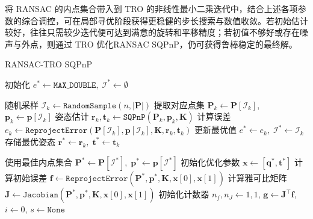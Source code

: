 将 RANSAC 的内点集合带入到 TRO 的非线性最小二乘迭代中，结合上述各项参数的综合调控，可在局部寻优阶段获得更稳健的步长搜索与数值收敛。若初始估计较好，往往只需较少迭代便可达到满意的旋转和平移精度；若初值不够好或存在噪声与外点，则通过 TRO 优化RANSAC SQPnP，仍可获得鲁棒稳定的最终解。
\begin{algorithm}[!htbp]
	\caption{RANSAC-TRO SQPnP}
	\label{alg:RANSAC_TRO_SQPnP}
	\begin{spacing}{0.9}  %
		\footnotesize        %
		\begin{algorithmic}[1]
			
			\State 初始化 $e^* \gets \texttt{MAX\_DOUBLE},\;\mathcal{I}^* \gets \emptyset$
			
			\State 随机采样 $\mathcal{I}_k \gets \texttt{RandomSample}(n, |\mathbf{P}|)$
			\State 提取对应点集 $\mathbf{P}_k \gets \mathbf{P}[\mathcal{I}_k]$, $\mathbf{p}_k \gets \mathbf{p}[\mathcal{I}_k]$
			\State 姿态估计 $\mathbf{r}_k, \mathbf{t}_k \gets \texttt{SQPnP}(\mathbf{P}_k, \mathbf{p}_k, \mathbf{K})$
			\State 计算误差 $e_k \gets \texttt{ReprojectError}(\mathbf{P}[\mathcal{I}_k], \mathbf{p}[\mathcal{I}_k], \mathbf{K}, \mathbf{r}_k, \mathbf{t}_k)$
			\State 更新最优值 $e^* \gets e_k,\;\mathcal{I}^* \gets \mathcal{I}_k$
			\State 存储最优姿态 $\mathbf{r}^* \gets \mathbf{r}_k,\;\mathbf{t}^* \gets \mathbf{t}_k$
			\EndIf
			\EndFor
			
			\State 使用最佳内点集合 $\mathbf{P}^* \gets \mathbf{P}[\mathcal{I}^*],\;\mathbf{p}^* \gets \mathbf{p}[\mathcal{I}^*]$
			\State 初始化优化参数 $\mathbf{x} \gets [\mathbf{q}^*, \mathbf{t}^*]$
			\State 计算初始误差 $\mathbf{f} \gets \texttt{ReprojectError}(\mathbf{P}^*, \mathbf{p}^*, \mathbf{K}, \mathbf{x}[0], \mathbf{x}[1])$
			\State 计算雅可比矩阵 $\mathbf{J} \gets \texttt{Jacobian}(\mathbf{P}^*, \mathbf{p}^*, \mathbf{K}, \mathbf{x}[0], \mathbf{x}[1])$
			\State 初始化计数器 $n_f, n_J \gets 1, 1$, $\mathbf{g} \gets \mathbf{J}^\top \mathbf{f}$, $i \gets 0$, $s \gets \texttt{None}$
			

\end{algorithmic}
\end{spacing}
\end{algorithm}
